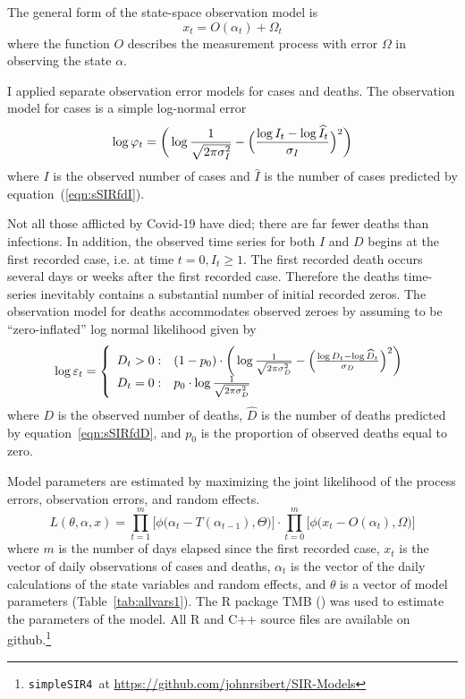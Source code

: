 \documentclass[12pt,letterpaper]{article}
\newcommand\SSm{{\tt simpleSIR4}}
\begin{document}
The general form of the state-space observation model is
\begin{equation}
x_t = O(\alpha_t) + \Omega_t
\end{equation}
where the function $O$ describes the measurement process with
error $\Omega$ in observing the state $\alpha$.

I applied separate observation error models for cases and
deaths. The observation model for cases is a simple log-normal error
\begin{equation}
\label{eqn:logNlike}
\log\varphi_t = \bigg(\log\frac{1}{\sqrt{2\pi\sigma^2_I}} -\Bigl(\frac{\log
I_t-\log\widehat{I}_t}{\sigma_I}\Bigr)^2\bigg)\\
\end{equation}
where $I$ is the observed number of cases and $\widehat{I}$ is the
number of cases predicted by equation~(\ref{eqn:sSIRfdI}).


Not all those afflicted by Covid-19 have died; there are far fewer
deaths than infections. In addition,
the observed time series for both $I$ and $D$ begins at the first recorded
case, i.e. at time $t=0, I_t \ge 1$. The first recorded death occurs
several days or weeks after the first recorded case.
Therefore the deaths time-series inevitably contains a
substantial number of initial recorded zeros. 
The observation model for deaths accommodates observed zeroes by
assuming to be ``zero-inflated'' log normal likelihood given by
\begin{equation}
\label{eqn:ZIlogNlike}
  \log \varepsilon_t = \left\{
    \begin{array}{r@{\;:\quad}l}
       D_t > 0 &
(1-p_0)\cdot\bigg(\log\frac{1}{\sqrt{2\pi\sigma^2_D}}
          -\Bigl(\frac{\log D_t-\log\widehat{D}_t}{\sigma_D}\Bigr)^2\bigg)\\
       D_t = 0 & p_0 \cdot\log \frac{1}{\sqrt{2\pi\sigma^2_D}}\\
    \end{array}
  \right.
\end{equation}
where $D$ is the observed number of deaths,
$\widehat{D}$ is the number of deaths predicted by
equation~\ref{eqn:sSIRfdD}, 
and $p_0$ is the proportion of observed deaths equal to zero.

Model parameters are estimated by
maximizing the joint likelihood of the process errors, observation
errors, and random effects.
\begin{equation}
\label{eqn:likelihood}
L(\theta,\alpha,x)=
\prod^m_{t=1}\big[\phi\big(\alpha_t-T(\alpha_{t-1}), \Theta\big)\big]\cdot
\prod^m_{t=0}\big[\phi\big(x_t-O(\alpha_t), \Omega\big)\big]
\end{equation}
where $m$ is the number of days elapsed since the first recorded case,
$x_t$ is the vector of daily observations of cases and deaths,
$\alpha_t$ is the vector of the daily calculations of the state
variables and random effects,
and $\theta$ 
is a vector of model parameters (Table~\ref{tab:allvars1}).
The R package TMB (\cite{TMB0000}) was used to 
estimate the parameters of the model. 
All R and C++ source files are available on 
github.\footnote{\SSm~at \url{https://github.com/johnrsibert/SIR-Models}}
\end{document}
